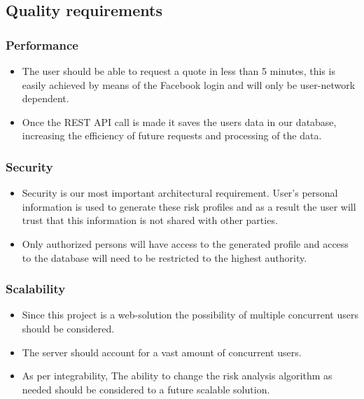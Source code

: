 \documentclass{article}
\begin{document}
	
	\subsection{Quality requirements}
		\subsubsection{Performance}
		\begin{itemize}
			\item The user should be able to request a quote in less than 5 minutes, this is easily achieved by means of the Facebook login and will only be user-network dependent.
			\item Once the REST API call is made it saves the users data in our database, increasing the efficiency of future requests and processing of the data.
		\end{itemize}
		 
		\subsubsection{Security}
		\begin{itemize}
			\item Security is our most important architectural requirement. User's personal information is used to generate these risk profiles and as a result the user will trust that this information is not shared with other parties.
			\item Only authorized persons will have access to the generated profile and access to the database will need to be restricted to the highest authority.
		\end{itemize}
		\subsubsection{Scalability}
		\begin{itemize}
			\item Since this project is a web-solution the possibility of multiple concurrent users should be considered.
			\item The server should account for a vast amount of concurrent users.
			\item As per integrability, The ability to change the risk analysis algorithm as needed should be considered to a future scalable solution.
		\end{itemize}
\end{document}
